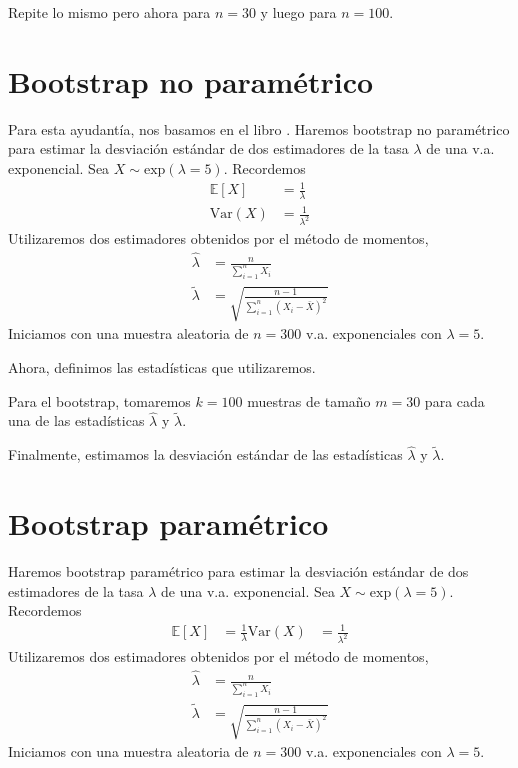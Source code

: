 \documentclass[10pt]{article}\usepackage[]{graphicx}\usepackage[]{xcolor}
\newcommand{\mean}[1]{\mathbb{E}\left[#1\right]}
\newcommand{\var}[1]{\mathrm{Var}\left(#1\right)}
\begin{document}
Repite lo mismo pero ahora para $n=30$ y luego para $n=100$.





\section{Bootstrap no paramétrico}
Para esta ayudantía, nos basamos en el libro \cite{Wasserman2004}. Haremos bootstrap no paramétrico para estimar la desviación estándar de dos estimadores de la tasa $\lambda$ de una v.a. exponencial. Sea $X\sim \mathrm{exp}(\lambda = 5)$. Recordemos
\begin{align*}
  \mean{X} &= \frac{1}{\lambda}\\
  \var{X} &= \frac{1}{\lambda^2}
\end{align*}
Utilizaremos dos estimadores obtenidos por el método de momentos,
\begin{align*}
  \hat{\lambda} &= \frac{n}{\sum\limits_{i=1}^n X_i}\\
  \tilde{\lambda} &= \sqrt{\frac{n-1}{\sum\limits_{i=1}^n \left(X_i - \bar{X} \right)^2}}
\end{align*}
Iniciamos con una muestra aleatoria de $n=300$ v.a. exponenciales con $\lambda=5$.

Ahora, definimos las estadísticas que utilizaremos.

Para el bootstrap, tomaremos $k=100$ muestras de tamaño $m=30$ para cada una de las estadísticas $\hat{\lambda}$ y $\tilde{\lambda}$.

Finalmente, estimamos la desviación estándar de las estadísticas $\hat{\lambda}$ y $\tilde{\lambda}$.


\section{Bootstrap paramétrico}
Haremos bootstrap paramétrico para estimar la desviación estándar de dos estimadores de la tasa $\lambda$ de una v.a. exponencial. Sea $X\sim \mathrm{exp}(\lambda = 5)$. Recordemos
\begin{align*}
  \mean{X} &= \frac{1}{\lambda}
  \var{X} &= \frac{1}{\lambda^2}
\end{align*}
Utilizaremos dos estimadores obtenidos por el método de momentos,
\begin{align*}
  \hat{\lambda} &= \frac{n}{\sum\limits_{i=1}^n X_i}\\
  \tilde{\lambda} &= \sqrt{\frac{n-1}{\sum\limits_{i=1}^n \left(X_i - \bar{X} \right)^2}}
\end{align*}
Iniciamos con una muestra aleatoria de $n=300$ v.a. exponenciales con $\lambda=5$.
\end{document}
